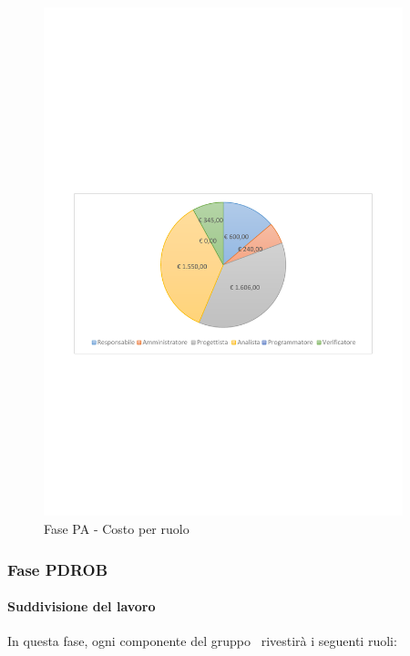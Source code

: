 \documentclass[../PianoProgetto.tex]{subfiles}
\begin{document}
\vfill	
\newpage
\vfill
	\begin{figure}[!h]
		\centering
		\includegraphics[width=0.93\textwidth , trim=2cm 9.5cm 2cm 11cm]{grafici/PA/PA-costo}
			\caption{Fase PA - Costo per ruolo}
		\label{fig:CircleChart-fasePA_costo}
	\end{figure}	
\vfill	
	\subsubsection{Fase PDROB}
				\paragraph{Suddivisione del lavoro}
					In questa fase\g, ogni componente del gruppo \leaf\ rivestirà i seguenti ruoli:
	
\end{document}
